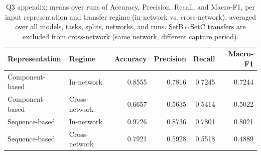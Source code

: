 \begin{table}
\caption{Q3 appendix: means over runs of Accuracy, Precision, Recall, and Macro-F1, per input representation and transfer regime (in-network vs. cross-network), averaged over all models, tasks, splits, networks, and runs. SetB↔SetC transfers are excluded from cross-network (same network, different capture period).}
\label{tab:q3_appendix_representation}
\begin{tabular}{llrrrr}
\toprule
Representation & Regime & Accuracy & Precision & Recall & Macro-F1 \\
\midrule
Component-based & In-network & 0.8555 & 0.7816 & 0.7245 & 0.7244 \\
Component-based & Cross-network & 0.6657 & 0.5635 & 0.5414 & 0.5022 \\
Sequence-based & In-network & 0.9726 & 0.8736 & 0.7801 & 0.8021 \\
Sequence-based & Cross-network & 0.7921 & 0.5928 & 0.5518 & 0.4889 \\
\bottomrule
\end{tabular}
\end{table}
